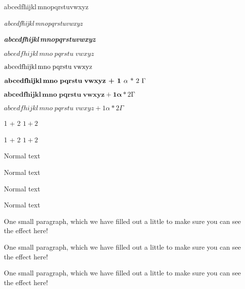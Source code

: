 \documentclass{article}
\begin{document}
\begin{titlepage}
\lipsum[1]

abcedf\.hijkl\,mno\;pqrstu\;vwxyz

\textit{abcedf\.hijkl\,mno\;pqrstu\;vwxyz}

\textit{\textbf{abcedf\.hijkl\,mno\;pqrstu\;vwxyz}}

$ abcedfhijkl\,mno\;pqrstu\;vwxyz $ %

$ \textrm{abcedfhijkl\,mno\;pqrstu\;vwxyz} $

$ \textrm{\textbf{abcedfhijkl\,mno\;pqrstu\;vwxyz + 1 $\alpha$} * 2 $\Gamma$} $




$ \mathrm{\mathbf{abcedfhijkl\,mno\;pqrstu\;vwxyz + 1 \alpha} * 2 \Gamma} $

\boldmath$ { abcedfhijkl\,mno\;pqrstu\;vwxyz + 1 \alpha * 2 \Gamma} $


1 + 2 $ 1 + 2$
\unboldmath

1 + 2 $ 1 + 2$

{Normal text
\tiny
\lipsum[2]
}
\lipsum[3]

{Normal text
\tiny
\lipsum[2]
\par
}
\lipsum[3]

{Normal text
\huge
\lipsum[4]
}
\lipsum[5]

{Normal text
\huge
\lipsum[4]
\par
}
\lipsum[5]


\bfseries %
\end{titlepage}

One small paragraph, which we have filled out a little to make sure you can
see the effect here!

One small paragraph, which we have filled out a little to make sure you can
see the effect here!

\noindent  One small paragraph, which we have filled out a little to make sure
you can see the effect here!
\end{document}
